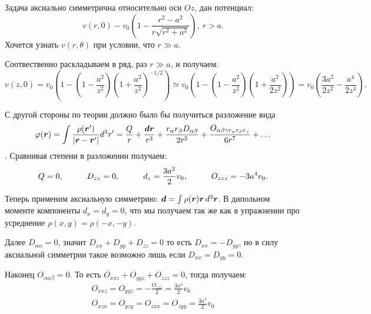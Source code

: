 

Задача аксиально симметрична относительно оси $Oz$, дан потенциал:
\begin{equation*}
    v(r,0) - v_0 \left(1 - \frac{r^2 - a^2}{r \sqrt{r^2 + a^2}}\right), \ r>a.
\end{equation*}
Хочется узнать $v(r,\theta)$ при условии, что $r \gg a$.

Соотвественно раскладываем в ряд, раз $r \gg a$, и получаем:
\begin{equation*}
    v(z,0) = v_0 \left(1 - \left(1 - \frac{a^2}{z^2}\right)\left(1 + \frac{a^2}{z^2}\right)^{-1/2}\right) 
    \simeq
    v_0 \left(1 - \left(1 - \frac{a^2}{z^2}\right)\left(1 + \frac{a^2}{2z^2}\right)\right) 
    =
    v_0 \left(\frac{3 a^2}{2 z^2} - \frac{a^4}{2 z^4}\right).
\end{equation*}

С другой стороны по теории должно было бы получиться разложение вида
\begin{equation*}
    \varphi(\mbox{\boldmath $r$}) = \int \frac{\rho (\mbox{\boldmath $r$}')}{|\mbox{\boldmath $r$} - \mbox{\boldmath $r$}'|}d^3 r'
    = \frac{Q}{r} + \frac{\mbox{\boldmath $d$} \mbox{\boldmath $r$}}{r^3} + \frac{r_\alpha r_\beta D_{\alpha\beta}}{2 r^5} + \frac{O_{\alpha\beta\gamma r_\alpha r_\beta r_\gamma}}{6 r^7} + \ldots
\end{equation*}
. Сравнивая степени в разложении получаем:
\begin{equation*}
    Q = 0, \hspace{1 cm} D_{z z} = 0, \hspace{1 cm} d_z = \frac{3 a^2}{2}v_0,
    \hspace{1 cm} O_{z z z} = - 3 a^4 v_0.
\end{equation*}

Теперь применим аксиальную симметрию: $\mbox{\boldmath $d$} = \int \rho(\mbox{\boldmath $r$}) \mbox{\boldmath $r$} \, d^3 \mbox{\boldmath $r$}$. В дипольном моменте компоненты $d_x = d_y = 0$, что мы получаем так же как в упражнении про усреднение $\rho(x, y) = \rho(-x,-y)$.

Далее $D_{\alpha\alpha} = 0$, значит $D_{xx} + D_{yy} + D_{zz} = 0$ то есть $D_{xx} = - D_{yy}$, но в силу аксиальной симметрии такое возможно лишь если $D_{xx} = D_{yy} = 0$.

Наконец $O_{\alpha\alpha\beta} = 0$. То есть $O_{xxz} + O_{yyz} + O_{zzz} = 0$, тогда получаем: 
\begin{gather*}
    O_{xxz} = O_{yyz} = - \frac{O_{zzz}}{2} = \frac{3 a^4}{2}v_0\\
    O_{xzx} = O_{yzy} = O_{zxx} = O_{zyy} = \frac{3 a^4}{2}v_0
\end{gather*}

